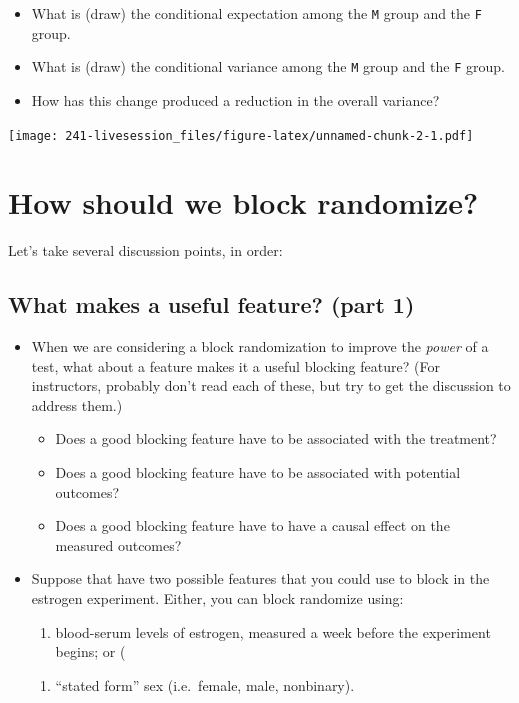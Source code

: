 \documentclass[
]{book}
\providecommand{\tightlist}{%
  \setlength{\itemsep}{0pt}\setlength{\parskip}{0pt}}
\begin{document}
\begin{itemize}
\tightlist
\item
  What is (draw) the conditional expectation among the \texttt{M} group
  and the \texttt{F} group.
\item
  What is (draw) the conditional variance among the \texttt{M} group and
  the \texttt{F} group.
\item
  How has this change produced a reduction in the overall variance?
\end{itemize}

\texttt{[image: 241-livesession\_files/figure-latex/unnamed-chunk-2-1.pdf]}

\hypertarget{how-should-we-block-randomize}{%
\section{How should we block
randomize?}\label{how-should-we-block-randomize}}

Let's take several discussion points, in order:

\hypertarget{what-makes-a-useful-feature-part-1}{%
\subsection{What makes a useful feature? (part
1)}\label{what-makes-a-useful-feature-part-1}}

\begin{itemize}
\item
  When we are considering a block randomization to improve the
  \emph{power} of a test, what about a feature makes it a useful
  blocking feature? (For instructors, probably don't read each of these,
  but try to get the discussion to address them.)

  \begin{itemize}
  \tightlist
  \item
    Does a good blocking feature have to be associated with the
    treatment?
  \item
    Does a good blocking feature have to be associated with potential
    outcomes?
  \item
    Does a good blocking feature have to have a causal effect on the
    measured outcomes?
  \end{itemize}
\item
  Suppose that have two possible features that you could use to block in
  the estrogen experiment. Either, you can block randomize using:

  \begin{enumerate}
  \def\labelenumi{(\alph{enumi})}
  \tightlist
  \item
    blood-serum levels of estrogen, measured a week before the
    experiment begins; or (
  \end{enumerate}

  \begin{enumerate}
  \def\labelenumi{\alph{enumi})}
  \setcounter{enumi}{1}
  \tightlist
  \item
    ``stated form'' sex (i.e.~female, male, nonbinary).
  \end{enumerate}
\end{itemize}
\end{document}
